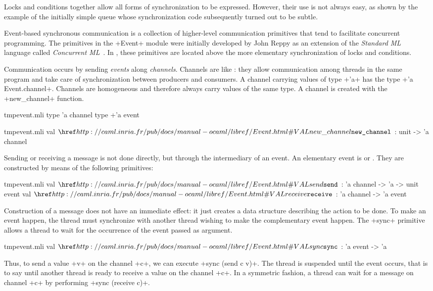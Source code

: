 Locks and conditions together allow all forms of synchronization to be
expressed.  However, their use is not always easy, as shown
by the example of the initially simple queue whose synchronization
code subsequently turned out to be subtle.

Event-based synchronous communication is a collection of higher-level
communication primitives that tend to facilitate concurrent
programming.  The primitives in the \ml+Event+ module were initially
developed by John Reppy as an extension of the \emph{Standard ML}
language called \emph{Concurrent ML}~\cite{CML}.  In {\ocaml}, these
primitives are located above the more elementary synchronization of
locks and conditions.

Communication occurs by sending \emph{events} along \emph{channels}.
Channels are like : they allow communication
among threads in the same program and take care of synchronization
between producers and consumers.  A channel carrying values of type
\ml+'a+ has the type \ml+'a Event.channel+.  Channels are homogeneous
and therefore always carry values of the same type.  A channel is
created with the \ml+new_channel+ function.
%
\begin{codefile}{tmpevent.mli}
type 'a channel
type +'a event
\end{codefile}
%
\begin{listingcodefile}{tmpevent.mli}
val $\indexlibvalue{Event}{new\_channel}$ : unit -> 'a channel
\end{listingcodefile}
%
Sending or receiving a message is not done directly, but through the
intermediary of an event.  An elementary event is  or .  They are constructed by
means of the following primitives:
%
\begin{listingcodefile}{tmpevent.mli}
val $\indexlibvalue{Event}{send}$ : 'a channel -> 'a -> unit event
val $\indexlibvalue{Event}{receive}$ : 'a channel -> 'a event
\end{listingcodefile}
%
Construction of a message does not have an immediate effect: it just
creates a data structure describing the action to be done.  To make an
event happen, the thread must synchronize with another thread wishing
to make the complementary event happen.  The \ml+sync+ primitive
allows a thread to wait for the occurrence of the event passed
as argument.
%
\begin{listingcodefile}{tmpevent.mli}
val $\indexlibvalue{Event}{sync}$ : 'a event -> 'a
\end{listingcodefile}
%
Thus, to send a value \ml+v+ on the channel \ml+c+, we can execute
\ml+sync (send c v)+.  The thread is suspended until the event occurs,
that is to say until another thread is ready to receive a value on the
channel \ml+c+.  In a symmetric fashion, a thread can wait for a
message on channel \ml+c+ by performing \ml+sync (receive c)+.

